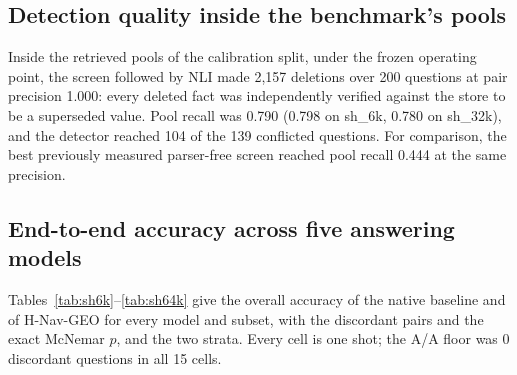 \documentclass[journal=jcisd8,manuscript=article]{achemso}
\begin{document}
\subsection{Detection quality inside the benchmark's pools}

Inside the retrieved pools of the calibration split, under the frozen operating point, the screen followed by NLI made 2,157 deletions over 200 questions at pair precision 1.000: every deleted fact was independently verified against the store to be a superseded value. Pool recall was 0.790 (0.798 on sh\_6k, 0.780 on sh\_32k), and the detector reached 104 of the 139 conflicted questions. For comparison, the best previously measured parser-free screen reached pool recall 0.444 at the same precision.

\subsection{End-to-end accuracy across five answering models}
\label{sec:e2e}

Tables~\ref{tab:sh6k}--\ref{tab:sh64k} give the overall accuracy of the native baseline and of H-Nav-GEO for every model and subset, with the discordant pairs and the exact McNemar $p$, and the two strata. Every cell is one shot; the A/A floor was 0 discordant questions in all 15 cells.

\begin{table}[H]\centering\small
\caption{sh\_6k (calibration split; $n=100$).}\label{tab:sh6k}
\end{table}
\end{document}
